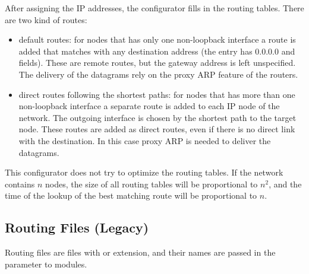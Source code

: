 After assigning the IP addresses, the configurator fills in the routing tables.
There are two kind of routes:
\begin{itemize}
  \item default routes: for nodes that has only one non-loopback interface
        a route is added that matches with any destination address
        (the entry has 0.0.0.0  and  fields).
        These are remote routes, but the gateway address is left unspecified.
        The delivery of the datagrams rely on the proxy ARP feature of the
        routers.
  \item direct routes following the shortest paths: for nodes that has more
        than one non-loopback interface a separate route is added to each
        IP node of the network. The outgoing interface is chosen by the
        shortest path to the target node. These routes are
        added as direct routes, even if there is no direct link with the
        destination. In this case proxy ARP is needed to deliver the datagrams.
\end{itemize}

\begin{note}
This configurator does not try to optimize the routing tables.
If the network contains $n$ nodes, the size of all routing tables
will be proportional to $n^2$, and the time of the lookup of the
best matching route will be proportional to $n$.
\end{note}


\subsection{Routing Files (Legacy)}
\label{sec:autoconfig:routing-files}

Routing files are files with  or  extension,
and their names are passed in the  parameter
to  modules.

